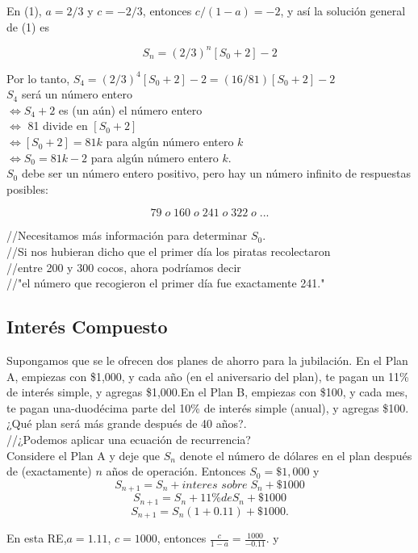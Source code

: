 \documentclass{article}
\begin{document}
En (1), $a=2/3$ y $c=-2/3$, entonces $c/(1-a) = -2$, y así la solución general de (1) es

$$
S_{n}= (2/3)^{n}[S_0 + 2] -2
$$

Por lo tanto, $S_{4} = (2/3)^{4}[S_0+2]-2 = (16/81)[S_0 + 2]-2$ \\

$S_4$ será un número entero\\
$\Leftrightarrow S_{4} + 2$ es (un aún) el número entero\\
$\Leftrightarrow$ 81 divide en $[S_0 + 2]$\\
$\Leftrightarrow [S_0 + 2] = 81k$ para algún número entero $k$\\
$\Leftrightarrow S_0 = 81k - 2$ para algún número entero $k$.\\

$S_{0}$ debe ser un número entero positivo, pero hay un número infinito de respuestas posibles:

$$79\; o \;160 \; o \; 241\; o \; 322 \; o\; ...$$

//Necesitamos más información para determinar $S_0$.\\
//Si nos hubieran dicho que el primer día los piratas recolectaron\\
//entre 200 y 300 cocos, ahora podríamos decir\\
//"el número que recogieron el primer día fue exactamente 241."


\subsection{Interés Compuesto}

Supongamos que se le ofrecen dos planes de ahorro para la jubilación. En el Plan A, empiezas con \$1,000, y cada año (en el aniversario del plan), te pagan un 11\% de interés simple, y agregas \$1,000.En el Plan B, empiezas con \$100, y cada mes, te pagan una-duodécima parte del 10\% de interés simple (anual), y agregas \$100.¿Qué plan será más grande después de 40 años?.\\
//¿Podemos aplicar una ecuación de recurrencia?\\
Considere el Plan A y deje que $S_n$ denote el número de dólares en el plan después de (exactamente) $n$ años de operación. Entonces $S_0 = \$1,000$ y
$$S_{n+1} = S_{n} + \textit{interes sobre}\; S_n + \$1000$$
$$S_{n+1} = S_{n} + 11\% \textit{de} S_n + \$1000$$
$$S_{n+1} = S_{n}(1+0.11) + \$1000.$$

En esta RE,$a=1.11$, $c=1000$, entonces $\frac{c}{1-a}=\frac{1000}{-0.11}$. y 
\end{document}
